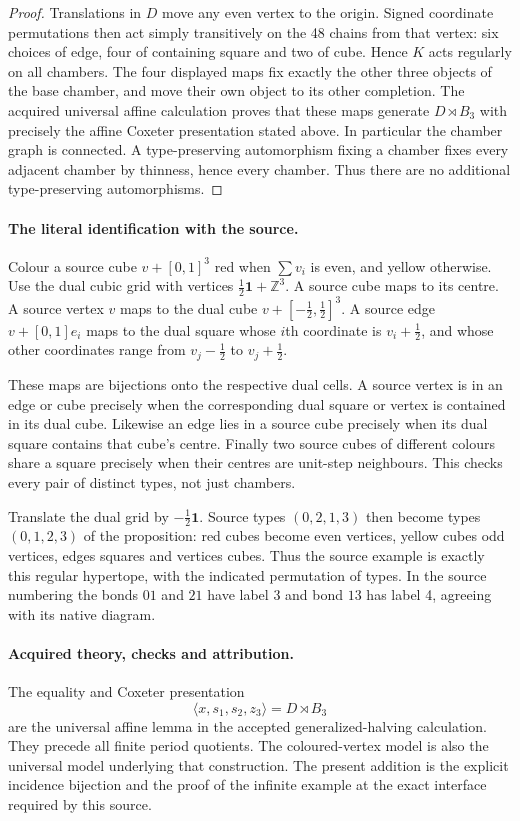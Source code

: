 \documentclass[11pt]{article}
\begin{document}
\begin{proof}
Translations in $D$ move any even vertex to the origin. Signed coordinate
permutations then act simply transitively on the 48 chains from that
vertex: six choices of edge, four of containing square and two of cube.
Hence $K$ acts regularly on all chambers. The four displayed maps fix
exactly the other three objects of the base chamber, and move their own
object to its other completion. The acquired universal affine calculation
proves that these maps generate $D\rtimes B_3$ with precisely the affine
Coxeter presentation stated above. In particular the chamber graph is
connected. A type-preserving automorphism fixing a chamber fixes every
adjacent chamber by thinness, hence every chamber. Thus there are no
additional type-preserving automorphisms.
\end{proof}

\paragraph{The literal identification with the source.}
Colour a source cube $v+[0,1]^3$ red when $\sum v_i$ is even, and yellow
otherwise. Use the dual cubic grid with vertices
$\frac12\mathbf1+\mathbb Z^3$. A source cube maps to its centre.
A source vertex $v$ maps to the dual cube
$v+[-\frac12,\frac12]^3$. A source edge
$v+[0,1]e_i$ maps to the dual square whose $i$th coordinate is
$v_i+\frac12$, and whose other coordinates range from
$v_j-\frac12$ to $v_j+\frac12$.

These maps are bijections onto the respective dual cells. A source
vertex is in an edge or cube precisely when the corresponding dual
square or vertex is contained in its dual cube. Likewise an edge lies
in a source cube precisely when its dual square contains that cube's
centre. Finally two source cubes of different colours share a square
precisely when their centres are unit-step neighbours. This checks
every pair of distinct types, not just chambers.

Translate the dual grid by $-\frac12\mathbf1$. Source types
$(0,2,1,3)$ then become types $(0,1,2,3)$ of the proposition:
red cubes become even vertices, yellow cubes odd vertices, edges
squares and vertices cubes. Thus the source example is exactly this
regular hypertope, with the indicated permutation of types. In the
source numbering the bonds $01$ and $21$ have label 3 and bond $13$
has label 4, agreeing with its native diagram.

\paragraph{Acquired theory, checks and attribution.}
The equality and Coxeter presentation
\[
\langle x,s_1,s_2,z_3\rangle=D\rtimes B_3
\]
are the universal affine lemma in the accepted generalized-halving
calculation. They precede
all finite period quotients. The coloured-vertex model is also the
universal model underlying that construction. The present addition is
the explicit incidence bijection and the proof of the infinite example
at the exact interface required by this source.
\end{document}
